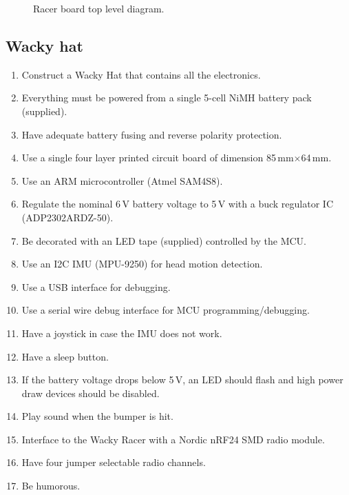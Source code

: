 \documentclass[11pt, a4paper]{article}
\begin{document}
\vspace{1cm}

\begin{figure}[h]
    \centering
    
    \caption{Racer board top level diagram.}
\end{figure}


\vfill\pagebreak

\subsection{Wacky hat}


\begin{enumerate}
\item Construct a Wacky Hat that contains all the electronics.
\item Everything must be powered from a single 5-cell NiMH battery pack (supplied).
\item Have adequate battery fusing and reverse polarity protection.
\item Use a single four layer printed circuit board of dimension 85\,mm$\times$64\,mm.
\item Use an ARM microcontroller (Atmel SAM4S8).
\item Regulate the nominal 6\,V battery voltage to 5\,V with a buck
  regulator IC (ADP2302ARDZ-50).
\item Be decorated with an LED tape (supplied) controlled by the MCU.
\item Use an I2C IMU (MPU-9250) for head motion detection.
\item Use a USB interface for debugging.
\item Use a serial wire debug interface for MCU programming/debugging.
\item Have a joystick in case the IMU does not work.
\item Have a sleep button.
\item If the battery voltage drops below 5\,V, an LED should flash and high power draw devices should be disabled.
\item Play sound when the bumper is hit.
\item Interface to the Wacky Racer with a Nordic nRF24 SMD radio module.
\item Have four jumper selectable radio channels.
\item Be humorous.
\end{enumerate}

\end{document}
